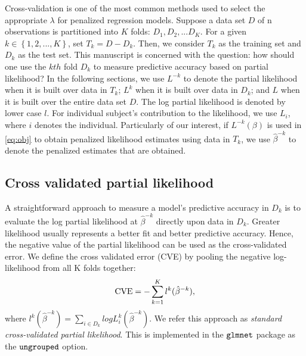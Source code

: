 \par Cross-validation is one of the most common methods used to select the appropriate $\lambda$ for penalized regression models. Suppose a data set $D$ of n observations is partitioned into $K$ folds: $D_{1}, D_{2}, ... D_{K}$. For a given $k \in \left\{1,2, ... , K\right\}$, set $T_{k} = D - D_{k}$. Then, we consider $T_{k}$ as the training set and $D_{k}$ as the test set. This manuscript is concerned with the question: how should one use the $kth$ fold $D_{k}$ to measure predictive accuracy based on partial likelihood? In the following sections, we use $L^{-k}$ to denote the partial likelihood when it is built over data in $T_k$; $L^{k}$ when it is built over data in $D_k$; and $L$ when it is built over the entire data set $D$.  The log partial likelihood is denoted by lower case $l$. For individual subject's contribution to the likelihood, we use $L_i$, where $i$ denotes the individual. Particularly of our interest, if $L^{-k}(\beta)$ is used in \eqref{eq:obj} to obtain penalized likelihood estimates using data in $T_k$, we use $\hat{\beta}^{-k}$ to denote the penalized estimates that are obtained. 

\subsection{Cross validated partial likelihood} 
\label{Sec:cox-cv-existing}
\par A straightforward approach to measure a model's predictive accuracy in $D_k$ is to evaluate the log partial likelihood at $\hat{\beta}^{-k}$ directly upon data in $D_k$. Greater likelihood usually represents a better fit and better predictive accuracy. Hence, the negative value of the partial likelihood can be used as the cross-validated error. We define the cross validated error (CVE) by pooling the negative log-likelihood from all K folds together:
\begin{equation}
  \label{eq:standard}
  \textrm{CVE} = - \sum_{k=1}^{K} l^{k}(\hat{\beta}^{-k}),
\end{equation}
where $l^{k}(\hat{\beta}^{-k}) = \sum \limits_{i \in D_{k}} log L^{k}_{i}(\hat{\beta}^{-k})$. We refer this approach as \emph{standard cross-validated partial likelihood}. This is implemented in the $\tt{glmnet}$ package as the $\tt{ungrouped}$ option.

